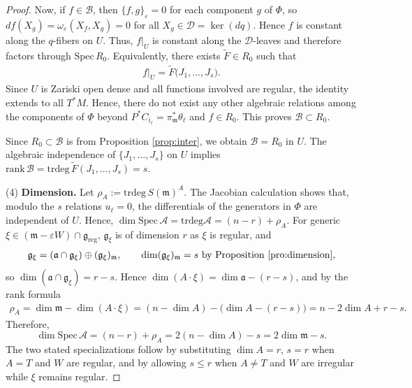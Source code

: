 \documentclass[11pt]{amsart}
\theoremstyle{definition}
\theoremstyle{plain}
\theoremstyle{conclusion}
\begin{document}
\begin{proof}
Now, if $f\in \mathcal{B}$, then $\{f,g\}_\varepsilon=0$ for each component $g$ of $\Phi$, so $df(X_g)=\omega_\varepsilon(X_f,X_g)=0$ for all $X_g\in\mathcal{D}=\ker(dq)$. Hence $f$ is constant along the $q$-fibers on $U$. Thus, $f\vert_U$ is constant along the $\mathcal{D}$-leaves and therefore factors through $\mathrm{Spec} \, R_0$. Equivalently, there exists $\widetilde{F}\in R_0$ such that \begin{align*}
    f\vert_U=\widetilde{F}\big(J_1,\dots,J_s\big).
\end{align*} Since $U$ is Zariski open dense and all functions involved are regular, the identity extends to all  $T^*M$. Hence, there do not exist any other algebraic relations among the components of $\Phi$ beyond $P^*C_{i_\ell} = \pi_\mathfrak{m}^* \theta_\ell$ and $f\in R_0$. This proves $\mathcal{B} \subset R_0$.  %

Since $R_0\subset \mathcal{B}$ is from Proposition \ref{prop:inter}, we obtain $\mathcal{B}=R_0$ in $U$. The algebraic independence of $\{J_1,\ldots,J_s\}$ on $U$ implies $\mathrm{rank} \, \mathcal{B} =\mathrm{trdeg} \,\widetilde{F}(J_1,\ldots,J_s)=s$.

(4) \textbf{Dimension.} Let $\rho_{A}:=\mathrm{trdeg} \, S(\mathfrak{m})^A$. The Jacobian calculation shows that, modulo the $s$ relations $u_{\ell}=0$, the differentials of the generators in $\Phi$ are independent of $U$. Hence,  $ \dim\mathrm{Spec} \,\mathcal{A}=\mathrm{trdeg}\mathcal{A}=(n-r)+\rho_{A}$.  For generic $\xi\in(\mathfrak{m}-\varepsilon W)\cap\mathfrak{g}_{\mathrm{reg}}$, $\mathfrak{g}_{\xi}$ is of dimension $r$ as $\xi$ is regular, and \begin{align*}
    \mathfrak{g}_{\xi}=(\mathfrak{a}\cap\mathfrak{g}_{\xi})\oplus(\mathfrak{g}_{\xi})_{\mathfrak{m}},\qquad \dim(\mathfrak{g}_{\xi})_{\mathfrak{m}}=s \text{ by Proposition } \ref{pro:dimension},
\end{align*} so $\dim(\mathfrak{a}\cap\mathfrak{g}_{\xi})=r-s$. Hence $\dim(A \cdot \xi)=\dim\mathfrak{a}-(r-s)$, and by the rank formula \begin{align*}
    \rho_{A}=\dim\mathfrak{m}-\dim(A \cdot \xi) =(n-\dim A)-\bigl(\dim A-(r-s)\bigr) =n-2\dim A+r-s.
\end{align*} Therefore, $$\dim\mathrm{Spec} \,\mathcal{A}=(n-r)+\rho_{A}=2(n-\dim A)-s=2\dim\mathfrak{m}-s.$$ The two stated specializations follow by substituting $\dim A=r$, $s=r$ when $A=T$ and $W$ are regular, and by allowing $s\leq r$ when $A\neq T$ and $W$ are irregular while $\xi$ remains regular.  
 \end{proof}
\end{document}
